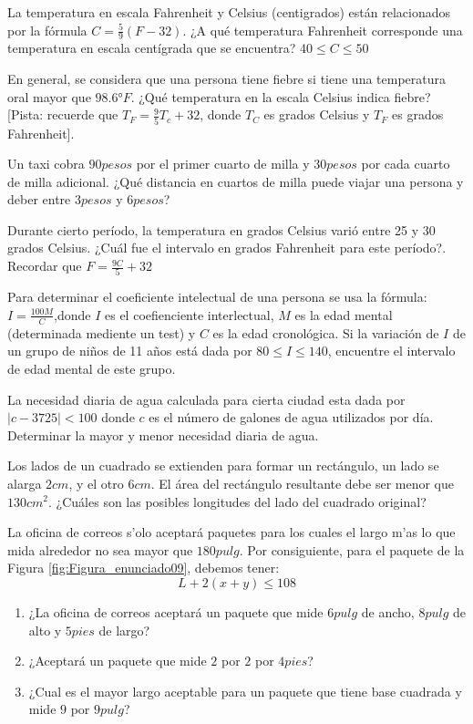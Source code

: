 \documentclass[]{book}
\theoremstyle{definition}
\theoremstyle{definition}
\theoremstyle{definition}
\theoremstyle{remark}
\begin{document}
La temperatura en escala Fahrenheit y Celsius (centigrados) están relacionados por la fórmula \(C=\frac{5}{9}(F-32)\). ¿A qué temperatura Fahrenheit corresponde una temperatura en escala centígrada que se encuentra? \(40\leq C \leq 50\)

En general, se considera que una persona tiene
fiebre si tiene una temperatura oral mayor que \(98.6°F\).
¿Qué temperatura en la escala Celsius indica fiebre? {[}Pista: recuerde que \(T_{F}=\frac{9}{5}T_{c}+32\), donde \(T_{C}\) es grados Celsius y \(T_{F}\) es
grados Fahrenheit{]}.

Un taxi cobra \(90 pesos\) por el primer cuarto de
milla y \(30 pesos\) por cada cuarto de milla adicional. ¿Qué distancia en cuartos de milla puede viajar una persona y deber
entre \(3 pesos\) y \(6 pesos\)?

Durante cierto período, la temperatura en grados Celsius varió entre 25 y 30 grados Celsius. ¿Cuál fue el intervalo en grados Fahrenheit para este período?. Recordar que \(F=\frac{9C}{5}+32\)

Para determinar el coeficiente intelectual de una persona se usa la fórmula: \(I=\frac{100M}{C}\),\break donde \(I\) es el coefienciente interlectual, \(M\) es la edad mental (determinada mediente un test) y \(C\) es la edad cronológica. Si la variación de \(I\) de un grupo de niños de 11 años está dada por \(80\leq I \leq 140\), encuentre el intervalo de edad mental de este grupo.

La necesidad diaria de agua calculada para cierta ciudad esta dada por \(\left|c-3725\right|<100\) donde \(c\) es el número de galones de agua utilizados por día. Determinar la mayor y menor necesidad diaria de agua.

Los lados de un cuadrado se extienden para formar un rectángulo, un lado se alarga \(2cm\), y el otro \(6cm\). El área del rectángulo resultante debe ser menor que \(130cm^2\). ¿Cuáles son las posibles longitudes del lado del cuadrado original?

La oficina de correos s'olo aceptará paquetes para los cuales el largo m'as lo que mida alrededor no sea mayor que \(180 pulg\). Por consiguiente, para el paquete de la Figura \ref{fig:Figura_enunciado09}, debemos tener:
\[L+2(x+y)\leq 108\]

\begin{enumerate}
	\item ¿La oficina de correos aceptará un paquete que mide $6 pulg$ de ancho, $8 pulg$ de alto y $5 pies$ de largo?
	\item ¿Aceptar\'a un paquete que mide $2$ por $2$ por $4 pies$?
	\item ¿Cual es el mayor largo aceptable para un paquete que tiene base cuadrada y mide $9$ por $9 pulg$?
\end{enumerate}
\end{document}

